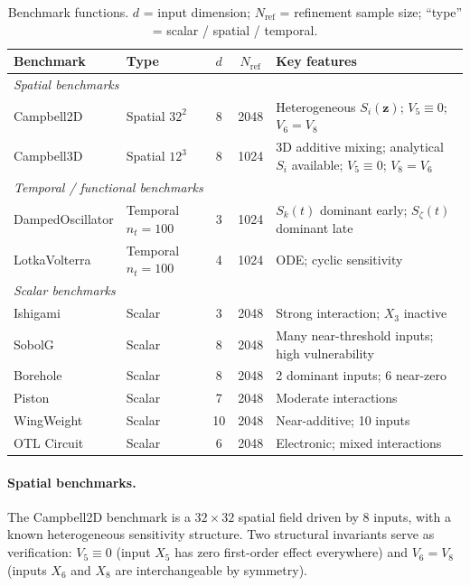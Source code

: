 \documentclass[11pt,onecolumn]{article}
\begin{document}
\begin{table}[H]
\centering
\caption{Benchmark functions. $d$ = input dimension; $N_\text{ref}$ = refinement
sample size; ``type'' = scalar / spatial / temporal.}
\label{tab:benchmarks}
\small
\begin{tabular}{llccp{5cm}}
\toprule
Benchmark & Type & $d$ & $N_\text{ref}$ & Key features \\
\midrule
\multicolumn{5}{l}{\textit{Spatial benchmarks}} \\
Campbell2D & Spatial $32^2$ & 8 & 2048 & Heterogeneous $S_i(\mathbf{z})$;
  $V_5\equiv0$; $V_6=V_8$ \\
Campbell3D & Spatial $12^3$ & 8 & 1024 & 3D additive mixing; analytical $S_i$ available; $V_5\equiv0$; $V_8=V_6$ \\
\midrule
\multicolumn{5}{l}{\textit{Temporal / functional benchmarks}} \\
DampedOscillator & Temporal $n_t=100$ & 3 & 1024 & $S_k(t)$ dominant early;
  $S_\zeta(t)$ dominant late \\
LotkaVolterra    & Temporal $n_t=100$ & 4 & 1024 & ODE; cyclic sensitivity \\
\midrule
\multicolumn{5}{l}{\textit{Scalar benchmarks}} \\
Ishigami   & Scalar & 3 & 2048 & Strong interaction; $X_3$ inactive \\
SobolG     & Scalar & 8 & 2048 & Many near-threshold inputs; high vulnerability \\
Borehole   & Scalar & 8 & 2048 & 2 dominant inputs; 6 near-zero \\
Piston     & Scalar & 7 & 2048 & Moderate interactions \\
WingWeight & Scalar & 10 & 2048 & Near-additive; 10 inputs \\
OTL Circuit & Scalar & 6 & 2048 & Electronic; mixed interactions \\
\bottomrule
\end{tabular}
\end{table}

\paragraph{Spatial benchmarks.}
The Campbell2D benchmark \citep{MarrelSpatial2011,Marrel2011} is a $32\times32$ spatial field
driven by 8 inputs, with a known heterogeneous sensitivity structure.
Two structural invariants serve as verification: $V_5 \equiv 0$ (input $X_5$
has zero first-order effect everywhere) and $V_6 = V_8$ (inputs $X_6$ and $X_8$
are interchangeable by symmetry).
\end{document}
